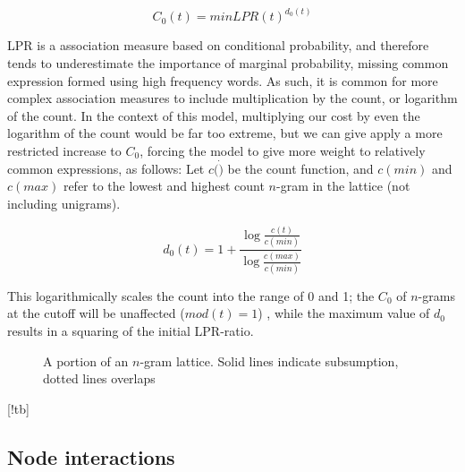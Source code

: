 \documentclass[11pt]{article}
\begin{document}
\begin{displaymath}
C_0(t) = minLPR(t)^{d_0(t)}
\end{displaymath}

LPR is a association measure based on conditional probability, and therefore tends to underestimate the importance of marginal probability, missing common expression formed using high frequency words. As such, it is common for more complex association measures to include multiplication by the count, or logarithm of the count. In the context of this model, multiplying our cost by even the logarithm of the count would be far too extreme, but we can give apply a more restricted increase to $C_0$, forcing the model to give more weight to relatively common expressions, as follows: Let $c(\dot)$ be the count function, and $c(min)$ and $c(max)$ refer to the lowest and highest count $n$-gram in the lattice (not including unigrams). 

\begin{displaymath}
d_0(t) = 1 + \frac{\log\frac{c(t)}{c(min)}}{\log\frac{c(max)}{c(min)}}
\end{displaymath}

This logarithmically scales the count into the range of 0 and 1; the $C_0$ of $n$-grams at the cutoff will be unaffected ($mod(t) = 1$) , while the maximum value of $d_0$ results in a squaring of the initial LPR-ratio.

\begin{figure}[!tb]
\caption{A portion of an $n$-gram lattice. Solid lines indicate subsumption, dotted lines overlaps}
\end{figure}[!tb]

\subsection{Node interactions}
\end{document}
